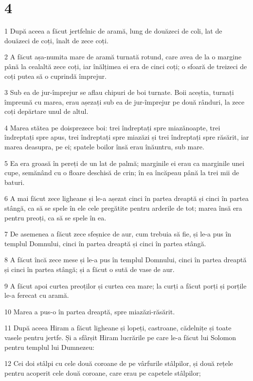 \chapter{4}

\par 1 După aceea a făcut jertfelnic de aramă, lung de douăzeci de coli, lat de douăzeci de coți, înalt de zece coți.
\par 2 A făcut așa-numita mare de aramă turnată rotund, care avea de la o margine până la cealaltă zece coți, iar înălțimea ei era de cinci coți; o sfoară de treizeci de coți putea să o cuprindă împrejur.
\par 3 Sub ea de jur-împrejur se aflau chipuri de boi turnate. Boii aceștia, turnați împreună cu marea, erau așezați sub ea de jur-împrejur pe două rânduri, la zece coți depărtare unul de altul.
\par 4 Marea stătea pe doisprezece boi: trei îndreptați spre miazănoapte, trei îndreptați spre apus, trei îndreptați spre miazăzi și trei îndreptați spre răsărit, iar marea deasupra, pe ei; spatele boilor însă erau înăuntru, sub mare.
\par 5 Ea era groasă în pereți de un lat de palmă; marginile ei erau ca marginile unei cupe, semănând cu o floare deschisă de crin; în ea încăpeau până la trei mii de baturi.
\par 6 A mai făcut zece ligheane și le-a așezat cinci în partea dreaptă și cinci în partea stângă, ca să se spele în ele cele pregătite pentru arderile de tot; marea însă era pentru preoți, ca să se spele în ea.
\par 7 De asemenea a făcut zece sfeșnice de aur, cum trebuia să fie, și le-a pus în templul Domnului, cinci în partea dreaptă și cinci în partea stângă.
\par 8 A făcut încă zece mese și le-a pus în templul Domnului, cinci în partea dreaptă și cinci în partea stângă; și a făcut o sută de vase de aur.
\par 9 A făcut apoi curtea preoților și curtea cea mare; la curți a făcut porți și porțile le-a ferecat cu aramă.
\par 10 Marea a pus-o în partea dreaptă, spre miazăzi-răsărit.
\par 11 După aceea Hiram a făcut ligheane și lopeți, castroane, cădelnițe și toate vasele pentru jertfe. Și a sfârșit Hiram lucrările pe care le-a făcut lui Solomon pentru templul lui Dumnezeu:
\par 12 Cei doi stâlpi cu cele două coroane de pe vârfurile stâlpilor, și două rețele pentru acoperit cele două coroane, care erau pe capetele stâlpilor;
